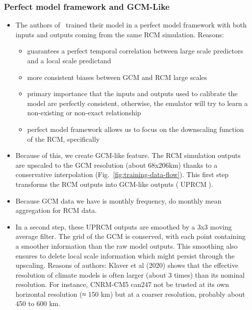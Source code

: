 \documentclass[a4paper,11pt,oneside]{report}
\begin{document}
\subsubsection{Perfect model framework and GCM-Like}
\begin{itemize}
    \item The authors of~\cite{Kittel} trained their model in a perfect model framework with both inputs and outputs coming from the same RCM simulation. Reasons: 
    \begin{itemize}
        \item guarantees a perfect temporal correlation between large scale predictors and a local scale predictand
        \item more consistent biases between GCM and RCM large scales
        \item primary importance that the inputs and outputs used to calibrate the model are perfectly consistent, otherwise, the emulator will try to learn a non-existing or non-exact relationship
        \item perfect model framework allows us to focus on the downscaling function of the RCM, specifically
    \end{itemize}
    \item Because of this, we create GCM-like feature. The RCM simulation outputs are upscaled to the GCM resolution (about 68x206km) thanks to a conservative interpolation (Fig.~\ref{fig:training-data-flow}). This first step transforms the RCM outputs into GCM-like outputs ($\operatorname{UPRCM}$). 
    \item Because GCM data we have is monthly frequency, do monthly mean aggregation for RCM data.
    \item In a second step, these UPRCM outputs are smoothed by a 3x3 moving average filter.  The grid of the GCM is conserved, with each point containing a smoother information than the raw model outputs. This smoothing also ensures to delete local scale information which might persist through the upscaling. Reasons of authors: Klaver et al (2020) shows that the effective resolution of climate models is often larger (about 3 times) than its nominal resolution. For instance, CNRM-CM5 can247 not be trusted at its own horizontal resolution (≈ 150 km) but at a coarser resolution, probably about 450 to 600 km. 
\end{itemize}
\end{document}

